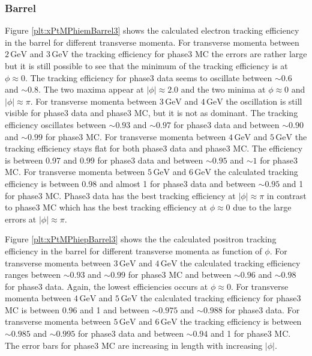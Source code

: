 \documentclass[a4paper,11pt,twosided,final,german,openbib,pdftex,listof=totoc,bibliography=totoc]{scrbook}
\begin{document}
\newpage
\subsubsection{Barrel}


Figure \ref{plt:xPtMPhiemBarrel3} shows the calculated electron tracking efficiency in the barrel for different transverse momenta.
For transverse momenta between $2\,\textrm{GeV}$ and $3\,\textrm{GeV}$ the tracking efficiency for phase3 MC the errors are rather large but it is still possible to see that the minimum of the tracking efficiency is at $\phi \approx 0$. The tracking efficiency for phase3 data seems to oscillate between $\sim 0.6$ and $\sim 0.8$. The two maxima appear at $|\phi| \approx 2.0$ and the two minima at $\phi \approx 0$ and $|\phi| \approx \pi$.
For transverse momenta between $3\,\textrm{GeV}$ and $4\,\textrm{GeV}$ the oscillation is still visible for phase3 data and phase3 MC, but it is not as dominant. The tracking efficiency oscillates between $\sim 0.93$ and  $\sim 0.97$ for phase3 data and between $\sim 0.90$ and $\sim 0.99$ for phase3 MC.
For transverse momenta between $4\,\textrm{GeV}$ and $5\,\textrm{GeV}$ the tracking efficiency stays flat for both phase3 data and phase3 MC. The efficiency is between 0.97 and 0.99 for phase3 data and between $\sim 0.95$ and $\sim 1$ for phase3 MC.
For transverse momenta between $5\,\textrm{GeV}$ and $6\,\textrm{GeV}$ the calculated tracking efficiency is between 0.98 and almost 1 for phase3 data and between $\sim 0.95$ and 1 for phase3 MC. Phase3 data has the best tracking efficiency at $|\phi| \approx \pi$ in contrast to phase3 MC which has the best tracking efficiency at $\phi \approx 0$ due to the large errors at $|\phi| \approx \pi$. 

Figure \ref{plt:xPtMPhiepBarrel3} shows the the calculated positron tracking efficiency in the barrel for different transverse momenta as function of $\phi$.
For transverse momenta between $3\,\textrm{GeV}$ and $4\,\textrm{GeV}$ the calculated tracking efficiency ranges between $\sim 0.93$ and $\sim 0.99$ for phase3 MC and between $\sim 0.96$ and $\sim 0.98$ for phase3 data. Again, the lowest efficiencies occurs at $\phi \approx 0$.
For transverse momenta between $4\,\textrm{GeV}$ and $5\,\textrm{GeV}$ the calculated tracking efficiency for phase3 MC is between 0.96 and 1 and between $\sim 0.975$ and $\sim 0.988$ for phase3 data. 
For transverse momenta between $5\,\textrm{GeV}$ and $6\,\textrm{GeV}$ the tracking efficiency is between $\sim 0.985$ and $\sim 0.995$ for phase3 data and between $\sim 0.94$ and 1 for phase3 MC. The error bars for phase3 MC are increasing in length with increasing $|\phi|$.
\end{document}
